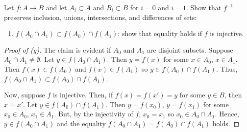 \begin{problem}[Munkres, \S2, 2(g).]
Let $f\colon A\to B$ and let $A_i\subset A$ and $B_i\subset B$
for $i=0$ and $i=1$. Show that $f^{-1}$ preserves inclusion,
unions, intersections, and differences of sets:
\begin{enumerate}[noitemsep]
\item[(g)] $f(A_0\cap A_1)\subset f(A_0)\cap f(A_1)$; show that
  equality holds if $f$ is injective.
\end{enumerate}
\end{problem}
\begin{proof}[Proof of (g)]
The claim is evident if $A_0$ and $A_1$ are disjoint
subsets. Suppose $A_0\cap A_1\neq\emptyset$. Let $y\in f(A_0\cap
A_1)$. Then $y=f(x)$ for some $x\in A_0$, $x\in A_1$. Then
$f(x)\in f(A_0)$ and $f(x)\in f(A_1)$ so $y\in f(A_0)\cap
f(A_1)$. Thus, $f(A_0\cap A_1)\subset f(A_0)\cap f(A_1)$.

Now, suppose $f$ is injective. Then, if $f(x)=f(x')=y$ for some
$y\in B$, then $x=x'$. Let $y\in f(A_0)\cap f(A_1)$. Then
$y=f(x_0)$, $y=f(x_1)$ for some $x_0\in A_0$, $x_1\in A_1$. But,
by the injectivity of $f$, $x_0=x_1$ so $x_0\in A_0\cap
A_1$. Hence, $y\in f(A_0\cap A_1)$ and the equality $f(A_0\cap
A_1)=f(A_0)\cap f(A_1)$ holds.
\end{proof}
\newpage

